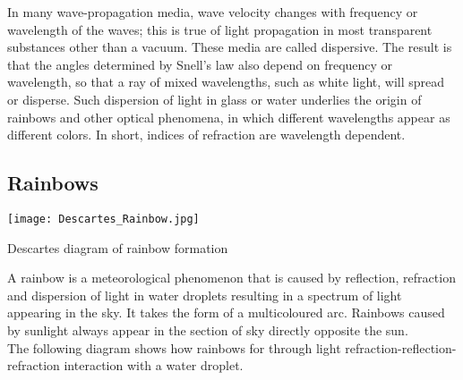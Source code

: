 In many wave-propagation media, wave velocity changes with frequency or wavelength of the waves; this is true of light propagation in most transparent substances other than a vacuum. These media are called dispersive. The result is that the angles determined by Snell's law also depend on frequency or wavelength, so that a ray of mixed wavelengths, such as white light, will spread or disperse. Such dispersion of light in glass or water underlies the origin of rainbows and other optical phenomena, in which different wavelengths appear as different colors.  In short, indices of refraction are wavelength dependent.

\subsection{Rainbows}
\begin{marginfigure}[50pt]
  \texttt{[image: Descartes\_Rainbow.jpg]}
  \caption{Descartes diagram of rainbow formation}
  \label{fig:marginfig}
\end{marginfigure}
A rainbow is a meteorological phenomenon that is caused by reflection, refraction and dispersion of light in water droplets resulting in a spectrum of light appearing in the sky. It takes the form of a multicoloured arc. Rainbows caused by sunlight always appear in the section of sky directly opposite the sun.\\
The following diagram shows how rainbows for through light refraction-reflection-refraction interaction with a water droplet.
\vspace{1.5cm}


